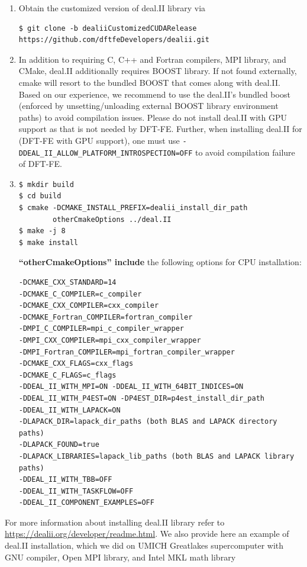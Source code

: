 \begin{enumerate}

\item Obtain the customized version of deal.II library via
\begin{verbatim}
$ git clone -b dealiiCustomizedCUDARelease https://github.com/dftfeDevelopers/dealii.git
\end{verbatim}

\item In addition to requiring C, C++ and Fortran compilers, MPI library, and CMake, deal.II additionally requires BOOST library. If not found externally, cmake will resort to the bundled BOOST that comes along with deal.II. Based on our experience, we recommend to use the deal.II's bundled boost (enforced by unsetting/unloading external BOOST library environment paths) to avoid compilation issues. Please do not install deal.II with GPU support as that is not needed by DFT-FE. Further, when installing deal.II for (DFT-FE with GPU support), one must use \verb|-DDEAL_II_ALLOW_PLATFORM_INTROSPECTION=OFF| to avoid compilation failure of DFT-FE.

\item
\begin{verbatim}
$ mkdir build
$ cd build
$ cmake -DCMAKE_INSTALL_PREFIX=dealii_install_dir_path
        otherCmakeOptions ../deal.II
$ make -j 8        
$ make install
\end{verbatim}
{\bf ``otherCmakeOptions'' include} the following options for CPU installation:
\begin{verbatim}
-DCMAKE_CXX_STANDARD=14
-DCMAKE_C_COMPILER=c_compiler
-DCMAKE_CXX_COMPILER=cxx_compiler
-DCMAKE_Fortran_COMPILER=fortran_compiler
-DMPI_C_COMPILER=mpi_c_compiler_wrapper
-DMPI_CXX_COMPILER=mpi_cxx_compiler_wrapper
-DMPI_Fortran_COMPILER=mpi_fortran_compiler_wrapper
-DCMAKE_CXX_FLAGS=cxx_flags
-DCMAKE_C_FLAGS=c_flags
-DDEAL_II_WITH_MPI=ON -DDEAL_II_WITH_64BIT_INDICES=ON
-DDEAL_II_WITH_P4EST=ON -DP4EST_DIR=p4est_install_dir_path
-DDEAL_II_WITH_LAPACK=ON
-DLAPACK_DIR=lapack_dir_paths (both BLAS and LAPACK directory paths)
-DLAPACK_FOUND=true
-DLAPACK_LIBRARIES=lapack_lib_paths (both BLAS and LAPACK library paths)
-DDEAL_II_WITH_TBB=OFF
-DDEAL_II_WITH_TASKFLOW=OFF
-DDEAL_II_COMPONENT_EXAMPLES=OFF
\end{verbatim}



\end{enumerate}	
 For more information about installing deal.II library refer to \url{https://dealii.org/developer/readme.html}. We also provide here an example of deal.II installation, which we did on UMICH Greatlakes supercomputer with GNU compiler, Open MPI library, and Intel MKL math library
